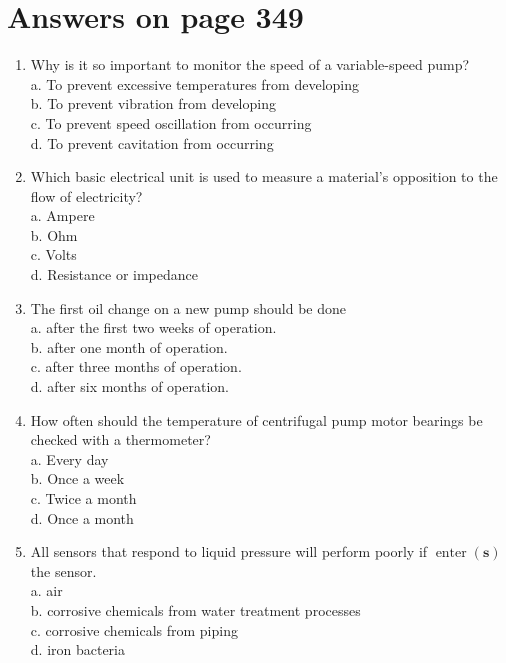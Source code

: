 \documentclass[10pt]{article}
\begin{document}
\section{Answers on page 349}
\begin{enumerate}
  \item Why is it so important to monitor the speed of a variable-speed pump?\\
a. To prevent excessive temperatures from developing\\
b. To prevent vibration from developing\\
c. To prevent speed oscillation from occurring\\
d. To prevent cavitation from occurring

  \item Which basic electrical unit is used to measure a material's opposition to the flow of electricity?\\
a. Ampere\\
b. Ohm\\
c. Volts\\
d. Resistance or impedance

  \item The first oil change on a new pump should be done\\
a. after the first two weeks of operation.\\
b. after one month of operation.\\
c. after three months of operation.\\
d. after six months of operation.

  \item How often should the temperature of centrifugal pump motor bearings be checked with a thermometer?\\
a. Every day\\
b. Once a week\\
c. Twice a month\\
d. Once a month

  \item All sensors that respond to liquid pressure will perform poorly if $\operatorname{enter}(\mathbf{s})$ the sensor.\\
a. air\\
b. corrosive chemicals from water treatment processes\\
c. corrosive chemicals from piping\\
d. iron bacteria

\end{enumerate}
\end{document}
